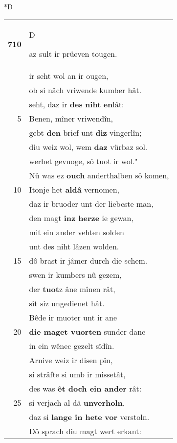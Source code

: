 \documentclass[8pt,a4paper,notitlepage]{article}
\begin{document}
\begin{table}[ht]
\begin{minipage}[t]{0.5\linewidth}
\small
\begin{center}*D
\end{center}
\begin{tabular}{rl}
\textbf{710} & \begin{large}D\end{large}az sult ir prüeven tougen.\\ 
 & ir seht wol an ir ougen,\\ 
 & ob si nâch vriwende kumber hât.\\ 
 & seht, daz ir \textbf{des} \textbf{niht} \textbf{en}lât:\\ 
5 & Benen, mîner vriwendîn,\\ 
 & gebt \textbf{den} brief unt \textbf{diz} vingerlîn;\\ 
 & diu weiz wol, wem \textbf{daz} vürbaz sol.\\ 
 & werbet gevuoge, sô tuot ir wol."\\ 
 & Nû was ez \textbf{ouch} anderthalben sô komen,\\ 
10 & Itonje het \textbf{aldâ} vernomen,\\ 
 & daz ir bruoder unt der liebeste man,\\ 
 & den magt \textbf{inz herze} ie gewan,\\ 
 & mit ein ander vehten solden\\ 
 & unt des niht lâzen wolden.\\ 
15 & dô brast ir jâmer durch die schem.\\ 
 & swen ir kumbers nû gezem,\\ 
 & der \textbf{tuot}z âne mînen rât,\\ 
 & sît siz ungedienet hât.\\ 
 & Bêde ir muoter unt ir ane\\ 
20 & \textbf{die maget vuorten} sunder dane\\ 
 & in ein wênec gezelt sîdîn.\\ 
 & Arnive weiz ir disen pîn,\\ 
 & si strâfte si umb ir missetât,\\ 
 & des was \textbf{êt doch ein ander} rât:\\ 
25 & si verjach al dâ \textbf{unverholn},\\ 
 & daz si \textbf{lange in hete} \textbf{vor} verstoln.\\ 
 & Dô sprach diu magt wert erkant:\\ 

\end{tabular}
\end{minipage}
\end{table}
\end{document}
